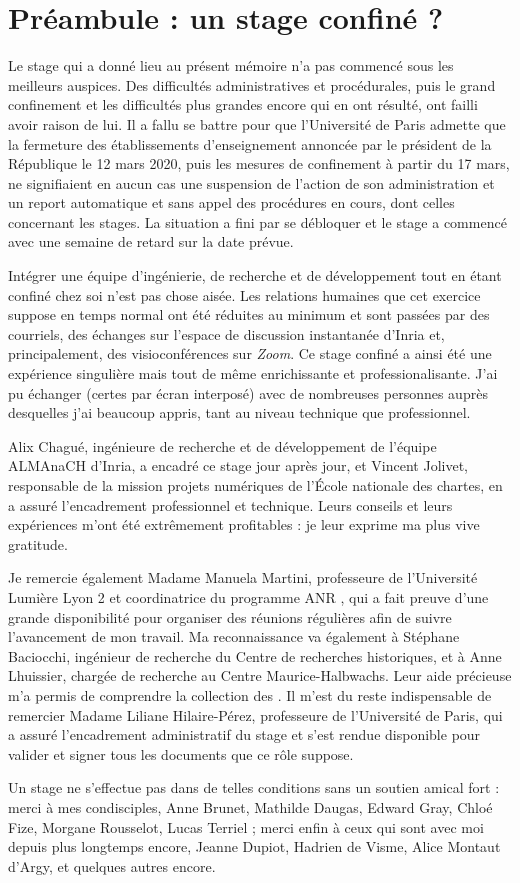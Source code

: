 \section*{Préambule : un stage confiné ?}

Le stage qui a donné lieu au présent mémoire n'a pas commencé sous les meilleurs auspices. Des difficultés administratives et procédurales, puis le grand confinement et les difficultés plus grandes encore qui en ont résulté, ont failli avoir raison de lui. Il a fallu se battre pour que l'Université de Paris admette que la fermeture des établissements d'enseignement annoncée par le président de la République le 12 mars 2020, puis les mesures de confinement à partir du 17 mars, ne signifiaient en aucun cas une suspension de l'action de son administration et un report automatique et sans appel des procédures en cours, dont celles concernant les stages. La situation a fini par se débloquer et le stage a commencé avec une semaine de retard sur la date prévue.

Intégrer une équipe d'ingénierie, de recherche et de développement tout en étant confiné chez soi n'est pas chose aisée. Les relations humaines que cet exercice suppose en temps normal ont été réduites au minimum et sont passées par des courriels, des échanges sur l'espace de discussion instantanée d'Inria et, principalement, des visioconférences sur \textit{Zoom}. Ce stage confiné a ainsi été une expérience singulière mais tout de même enrichissante et professionalisante. J'ai pu échanger (certes par écran interposé) avec de nombreuses personnes auprès desquelles j'ai beaucoup appris, tant au niveau technique que professionnel.

Alix Chagué, ingénieure de recherche et de développement de l'équipe ALMAnaCH d'Inria, a encadré ce stage jour après jour, et Vincent Jolivet, responsable de la mission projets numériques de l'École nationale des chartes, en a assuré l'encadrement professionnel et technique. Leurs conseils et leurs expériences m'ont été extrêmement profitables : je leur exprime ma plus vive gratitude.

Je remercie également Madame Manuela Martini, professeure de l'Université Lumière Lyon 2 et coordinatrice du programme ANR \timeus{}, qui a fait preuve d'une grande disponibilité pour organiser des réunions régulières afin de suivre l'avancement de mon travail. Ma reconnaissance va également à Stéphane Baciocchi, ingénieur de recherche du Centre de recherches historiques, et à Anne Lhuissier, chargée de recherche au Centre Maurice-Halbwachs. Leur aide précieuse m'a permis de comprendre la collection des \odm. Il m'est du reste indispensable de remercier Madame Liliane Hilaire-Pérez, professeure de l'Université de Paris, qui a assuré l'encadrement administratif du stage et s'est rendue disponible pour valider et signer tous les documents que ce rôle suppose.

Un stage ne s'effectue pas dans de telles conditions sans un soutien amical fort : merci à mes condisciples, Anne Brunet, Mathilde Daugas, Edward Gray, Chloé Fize, Morgane Rousselot, Lucas Terriel ; merci enfin à ceux qui sont avec moi depuis plus longtemps encore, Jeanne Dupiot, Hadrien de Visme, Alice Montaut d'Argy, et quelques autres encore.